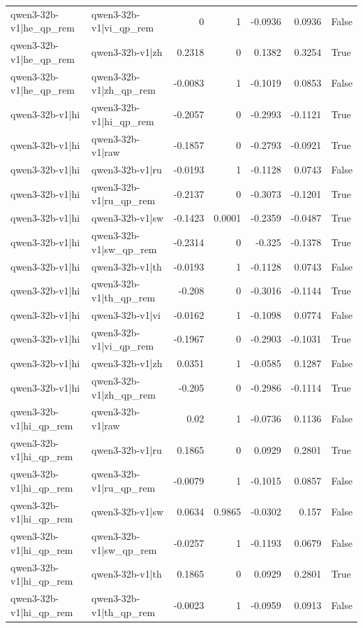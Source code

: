 \begin{table}
\begin{tabular}{l l r r r r l}
qwen3-32b-v1|he_qp_rem & qwen3-32b-v1|vi_qp_rem & 0 & 1 & -0.0936 & 0.0936 & False \\
qwen3-32b-v1|he_qp_rem & qwen3-32b-v1|zh & 0.2318 & 0 & 0.1382 & 0.3254 & True \\
qwen3-32b-v1|he_qp_rem & qwen3-32b-v1|zh_qp_rem & -0.0083 & 1 & -0.1019 & 0.0853 & False \\
qwen3-32b-v1|hi & qwen3-32b-v1|hi_qp_rem & -0.2057 & 0 & -0.2993 & -0.1121 & True \\
qwen3-32b-v1|hi & qwen3-32b-v1|raw & -0.1857 & 0 & -0.2793 & -0.0921 & True \\
qwen3-32b-v1|hi & qwen3-32b-v1|ru & -0.0193 & 1 & -0.1128 & 0.0743 & False \\
qwen3-32b-v1|hi & qwen3-32b-v1|ru_qp_rem & -0.2137 & 0 & -0.3073 & -0.1201 & True \\
qwen3-32b-v1|hi & qwen3-32b-v1|sw & -0.1423 & 0.0001 & -0.2359 & -0.0487 & True \\
qwen3-32b-v1|hi & qwen3-32b-v1|sw_qp_rem & -0.2314 & 0 & -0.325 & -0.1378 & True \\
qwen3-32b-v1|hi & qwen3-32b-v1|th & -0.0193 & 1 & -0.1128 & 0.0743 & False \\
qwen3-32b-v1|hi & qwen3-32b-v1|th_qp_rem & -0.208 & 0 & -0.3016 & -0.1144 & True \\
qwen3-32b-v1|hi & qwen3-32b-v1|vi & -0.0162 & 1 & -0.1098 & 0.0774 & False \\
qwen3-32b-v1|hi & qwen3-32b-v1|vi_qp_rem & -0.1967 & 0 & -0.2903 & -0.1031 & True \\
qwen3-32b-v1|hi & qwen3-32b-v1|zh & 0.0351 & 1 & -0.0585 & 0.1287 & False \\
qwen3-32b-v1|hi & qwen3-32b-v1|zh_qp_rem & -0.205 & 0 & -0.2986 & -0.1114 & True \\
qwen3-32b-v1|hi_qp_rem & qwen3-32b-v1|raw & 0.02 & 1 & -0.0736 & 0.1136 & False \\
qwen3-32b-v1|hi_qp_rem & qwen3-32b-v1|ru & 0.1865 & 0 & 0.0929 & 0.2801 & True \\
qwen3-32b-v1|hi_qp_rem & qwen3-32b-v1|ru_qp_rem & -0.0079 & 1 & -0.1015 & 0.0857 & False \\
qwen3-32b-v1|hi_qp_rem & qwen3-32b-v1|sw & 0.0634 & 0.9865 & -0.0302 & 0.157 & False \\
qwen3-32b-v1|hi_qp_rem & qwen3-32b-v1|sw_qp_rem & -0.0257 & 1 & -0.1193 & 0.0679 & False \\
qwen3-32b-v1|hi_qp_rem & qwen3-32b-v1|th & 0.1865 & 0 & 0.0929 & 0.2801 & True \\
qwen3-32b-v1|hi_qp_rem & qwen3-32b-v1|th_qp_rem & -0.0023 & 1 & -0.0959 & 0.0913 & False \\

\end{tabular}
\end{table}
